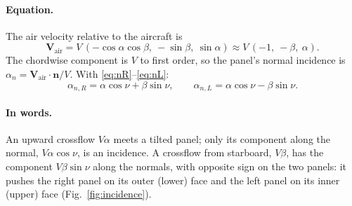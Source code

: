 \documentclass[11pt,a4paper]{article}
\newcommand{\vect}[1]{\mathbf{#1}}
\begin{document}
\paragraph{Equation.} The air velocity relative to the aircraft is
\begin{equation}
  \vect{V}_\mathrm{air} = V\,(-\cos\alpha\cos\beta,\ -\sin\beta,\ \sin\alpha)
  \approx V\,(-1,\ -\beta,\ \alpha). \label{eq:vair}
\end{equation}
The chordwise component is $V$ to first order, so the panel's normal incidence is
$\alpha_n = \vect{V}_\mathrm{air}\cdot\vect{n}/V$. With \eqref{eq:nR}--\eqref{eq:nL}:
\begin{equation}
  \boxed{\alpha_{n,R} = \alpha\cos\nu + \beta\sin\nu,\qquad
         \alpha_{n,L} = \alpha\cos\nu - \beta\sin\nu.} \label{eq:alphan}
\end{equation}

\paragraph{In words.} An upward crossflow $V\alpha$ meets a tilted panel; only its component along
the normal, $V\alpha\cos\nu$, is an incidence. A crossflow from starboard, $V\beta$, has the component
$V\beta\sin\nu$ along the normals, with opposite sign on the two panels: it pushes the
right panel on its outer (lower) face and the left panel on its inner (upper) face (Fig.~\ref{fig:incidence}).
\end{document}
